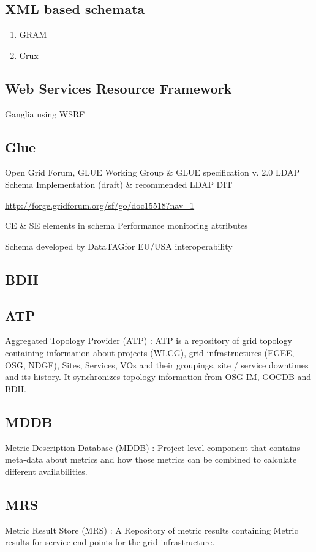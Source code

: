 \subsection{XML based schemata}
\begin{enumerate}
  \item{GRAM}
  \item{Crux}
\end{enumerate}

\subsection{Web Services Resource Framework}
Ganglia using WSRF \cite{gangliaWSRF}

\subsection{Glue}
Open Grid Forum, GLUE Working Group \& GLUE specification v. 2.0
LDAP Schema Implementation (draft) \& recommended LDAP DIT

\url{http://forge.gridforum.org/sf/go/doc15518?nav=1}

CE \& SE elements in schema
Performance monitoring attributes

Schema developed by DataTAGfor EU/USA interoperability


\subsection{BDII}


\subsection{ATP}
Aggregated Topology Provider (ATP) : ATP is a repository of grid topology
containing information about projects (WLCG), grid infrastructures (EGEE, OSG,
NDGF), Sites, Services, VOs and their groupings, site / service downtimes and
its history. It synchronizes topology information from OSG IM, GOCDB and BDII.

\subsection{MDDB}
Metric Description Database (MDDB) : Project-level component that contains
meta-data about metrics and how those metrics can be combined to calculate
different availabilities.

\subsection{MRS}
Metric Result Store (MRS) : A Repository of metric results containing Metric
results for service end-points for the grid infrastructure.

